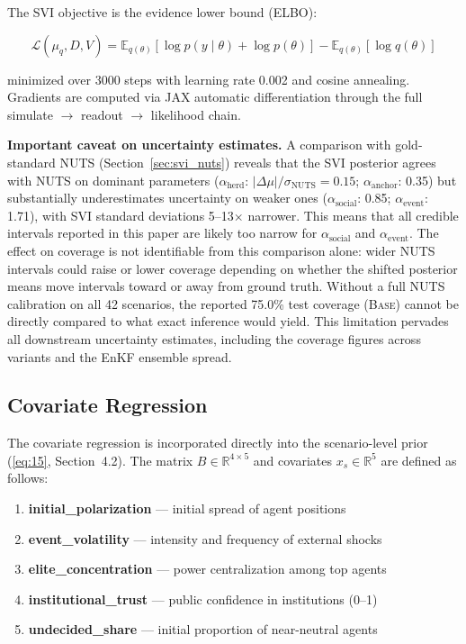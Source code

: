 \documentclass[12pt]{article}
\begin{document}
The SVI objective is the evidence lower bound (ELBO):

\begin{equation}\label{eq:22}
\mathcal{L}(\mu_q, D, V) = \mathbb{E}_{q(\theta)}[\log p(y \mid \theta) + \log p(\theta)] - \mathbb{E}_{q(\theta)}[\log q(\theta)]
\end{equation}

minimized over 3000 steps with learning rate 0.002 and cosine annealing. Gradients are computed via JAX automatic differentiation through the full simulate $\to$ readout $\to$ likelihood chain.

\textbf{Important caveat on uncertainty estimates.} A comparison with gold-standard NUTS (Section~\ref{sec:svi_nuts}) reveals that the SVI posterior agrees with NUTS on dominant parameters ($\alpha_{\text{herd}}$: $|\Delta\mu|/\sigma_{\text{NUTS}} = 0.15$; $\alpha_{\text{anchor}}$: 0.35) but substantially underestimates uncertainty on weaker ones ($\alpha_{\text{social}}$: 0.85; $\alpha_{\text{event}}$: 1.71), with SVI standard deviations 5--13$\times$ narrower. This means that all credible intervals reported in this paper are likely too narrow for $\alpha_{\text{social}}$ and $\alpha_{\text{event}}$. The effect on coverage is not identifiable from this comparison alone: wider NUTS intervals could raise or lower coverage depending on whether the shifted posterior means move intervals toward or away from ground truth. Without a full NUTS calibration on all 42 scenarios, the reported 75.0\% test coverage (\textsc{Base}) cannot be directly compared to what exact inference would yield. This limitation pervades all downstream uncertainty estimates, including the coverage figures across variants and the EnKF ensemble spread.

\subsection{Covariate Regression}
\label{sec:covariates}

The covariate regression is incorporated directly into the scenario-level prior (\eqref{eq:15}, Section~4.2). The matrix $B \in \mathbb{R}^{4 \times 5}$ and covariates $x_s \in \mathbb{R}^5$ are defined as follows:

\begin{enumerate}
    \item \textbf{initial\_polarization} --- initial spread of agent positions
    \item \textbf{event\_volatility} --- intensity and frequency of external shocks
    \item \textbf{elite\_concentration} --- power centralization among top agents
    \item \textbf{institutional\_trust} --- public confidence in institutions (0--1)
    \item \textbf{undecided\_share} --- initial proportion of near-neutral agents
\end{enumerate}
\end{document}
